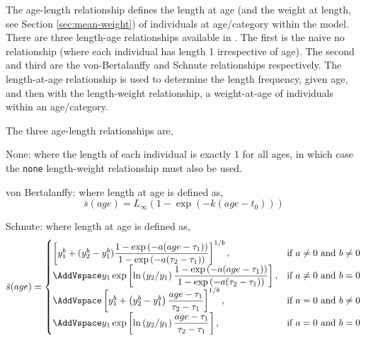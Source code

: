 The age-length relationship defines the length at age (and the weight at length, see Section \ref{sec:mean-weight}) of individuals at age/category within the model. There are three length-age relationships available in \CNAME. The first is the naive no relationship (where each individual has length 1 irrespective of age). The second  and third are the von-Bertalanffy and Schnute relationships respectively. The length-at-age relationship is used to determine the length frequency, given age, and then with the length-weight relationship, a weight-at-age of individuals within an age/category. 

The three age-length relationships are,

\begin{description}
\item {None:} where the length of each individual is exactly 1 for all ages, in which case the \texttt{none} length-weight relationship must also be used.
\item{von Bertalanffy:} where length at age is defined as,
\begin{equation} 
\bar{s}(age)= L_\infty \left( 1 - \exp \left( -k \left(age-t_0 \right) \right) \right)
\end{equation}

\item{Schnute:} where length at age is defined as,
\begin{equation}
\bar{s}(age)=\displaystyle\begin{cases}
  \left[ y_1^b + (y_2^b - y_1^b) \dfrac{1-\exp \left(-a(age - \tau_1) \right)}{1-\exp \left(-a(\tau_2 - \tau_1) \right)} \right]^{1/b}, & \text{if $a\ne0$ and $b\ne0$} \\
  \AddVspace
  y_1 \exp \left[ \ln \left( y_2 / y_1 \right) \dfrac{1-\exp \left(-a(age - \tau_1) \right)}{1-\exp \left(-a(\tau_2 - \tau_1) \right)} \right], & \text{if $a\ne0$ and $b=0$} \\
  \AddVspace
  \left[ y_1^b + \left( y_2^b - y_1^b \right) \dfrac{age-\tau_1}{\tau_2 - \tau_1} \right]^{1/b}, & \text{if $a=0$ and $b\ne0$} \\
  \AddVspace
  y_1 \exp \left[ \ln \left( y_2/y_1 \right) \dfrac{age-\tau_1}{\tau_2 - \tau_1} \right] , & \text{if $a=0$ and $b=0$} \\
  \end{cases}
\end{equation}
\end{description}

